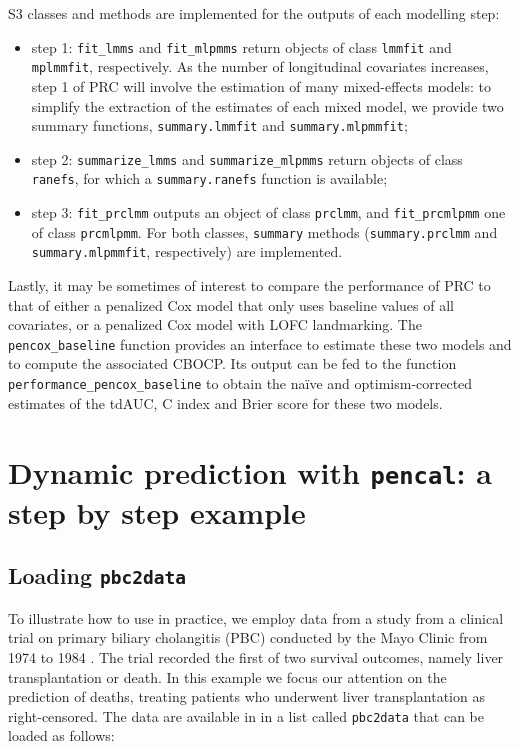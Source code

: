 S3 classes and methods are implemented for the outputs of each modelling
step:

\begin{itemize}
\tightlist
\item
  step 1: \texttt{fit\_lmms} and \texttt{fit\_mlpmms} return objects of
  class \texttt{lmmfit} and \texttt{mplmmfit}, respectively. As the
  number of longitudinal covariates increases, step 1 of PRC will
  involve the estimation of many mixed-effects models: to simplify the
  extraction of the estimates of each mixed model, we provide two
  summary functions, \texttt{summary.lmmfit} and
  \texttt{summary.mlpmmfit};
\item
  step 2: \texttt{summarize\_lmms} and \texttt{summarize\_mlpmms} return
  objects of class \texttt{ranefs}, for which a \texttt{summary.ranefs}
  function is available;
\item
  step 3: \texttt{fit\_prclmm} outputs an object of class
  \texttt{prclmm}, and \texttt{fit\_prcmlpmm} one of class
  \texttt{prcmlpmm}. For both classes, \texttt{summary} methods
  (\texttt{summary.prclmm} and \texttt{summary.mlpmmfit}, respectively)
  are implemented.
\end{itemize}

Lastly, it may be sometimes of interest to compare the performance of
PRC to that of either a penalized Cox model that only uses baseline
values of all covariates, or a penalized Cox model with LOFC
landmarking. The \texttt{pencox\_baseline} function provides an
interface to estimate these two models and to compute the associated
CBOCP. Its output can be fed to the function
\texttt{performance\_pencox\_baseline} to obtain the naïve and
optimism-corrected estimates of the tdAUC, C index and Brier score for
these two models.

\section{\texorpdfstring{Dynamic prediction with \texttt{pencal}: a step
by step
example}{Dynamic prediction with pencal: a step by step example}}\label{dynamic-prediction-with-pencal-a-step-by-step-example}

\subsection{\texorpdfstring{Loading
\texttt{pbc2data}}{Loading pbc2data}}\label{loading-pbc2data}

To illustrate how to use  in practice, we employ data
from a study from a clinical trial on primary biliary cholangitis (PBC)
conducted by the Mayo Clinic from 1974 to 1984 \citep{murtaugh1994}. The
trial recorded the first of two survival outcomes, namely liver
transplantation or death. In this example we focus our attention on the
prediction of deaths, treating patients who underwent liver
transplantation as right-censored. The data are available in
 in a list called \texttt{pbc2data} that can be loaded
as follows:

